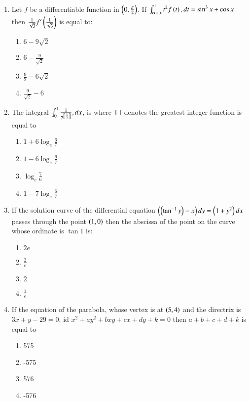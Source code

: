 \documentclass[journal]{IEEEtran}
\begin{document}
\begin{enumerate}
\item Let $f$ be a differentiable function in $\left(0,\frac{\pi}{2}\right)$. If $\int_{\cos{x}} ^{1} t^2f\left(t\right), dt = \sin^3{x} + \cos{x}$ then $\frac{1}{\sqrt{3}}f^{\prime}\left(\frac{1}{\sqrt{3}}\right)$ is equal to:
\begin{multicols}{2}
    \begin{enumerate}
        \item $6-9\sqrt{2}$
        \item $6-\frac{9}{\sqrt{2}}$
        \item $\frac{9}{2}-6\sqrt{2}$
        \item $\frac{9}{\sqrt{2}} - 6$
    \end{enumerate}
\end{multicols}

\item The integral $\int_0^1 \frac{1}{7^{{}\left[\frac{1}{x}\right]}}, dx$, is where ${}\left[.\right]$ denotes the greatest integer function is equal to
\begin{multicols}{2}
    \begin{enumerate}
        \item $1+6\log_e{\frac{6}{7}}$
        \item $1-6\log_e{\frac{6}{7}}$
        \item $\log_e{\frac{7}{6}}$
        \item $1-7\log_e{\frac{6}{7}}$
    \end{enumerate}
\end{multicols}

\item If the solution curve of the differential equation $\left(\left(\tan^{-1}y\right)-x\right)dy = \left(1+y^2\right)dx$ passes through the point $\left(1,0\right)$ then the abscissa of the point on the curve whose ordinate is $\tan{1}$ is:
\begin{multicols}{2}
    \begin{enumerate}
        \item $2e$
        \item $\frac{2}{e}$
        \item $2$
        \item $\frac{1}{e}$
    \end{enumerate}
\end{multicols}

\item If the equation of the parabola, whose vertex is at $\left(5,4\right)$ and the directrix is $3x+y-29=0$, id $x^2+ay^2+bxy+cx+dy+k=0$ then $a+b+c+d+k$ is equal to
\begin{multicols}{2}
    \begin{enumerate}
        \item 575
        \item -575
        \item 576
        \item -576
    \end{enumerate}
\end{multicols}


\end{enumerate}
\end{document}

